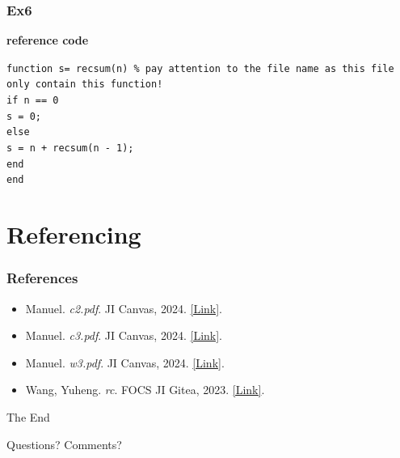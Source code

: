 \documentclass[
	11pt, %
]{beamer}
\begin{document}
\begin{frame}
	\frametitle{Ex6}
    \textbf{reference code}

    \bigskip

    \texttt{function s= recsum(n) \% pay attention to the file name as this file only contain this function!}
    \\\quad \texttt{if n == 0}
    \\\quad  \quad \texttt{s = 0;}
    \\\quad   \texttt{else}
    \\\quad  \quad \texttt{s = n + recsum(n - 1); }
    \\\quad   \texttt{end}
\\\texttt{end}

\end{frame}

\section{Referencing}

\begin{frame} %
	\frametitle{References}
	
	\begin{itemize}
    

    \item Manuel. \textit{c2.pdf}. JI Canvas, 2024. \href{https://jicanvas.com/courses/917/files/folder/lectures?preview=333612}{[Link]}.

    \item Manuel. \textit{c3.pdf}. JI Canvas, 2024. \href{https://jicanvas.com/courses/917/files/folder/lectures?preview=333613}{[Link]}.

    \item Manuel. \textit{w3.pdf}. JI Canvas, 2024. \href{https://jicanvas.com/courses/917/files/folder/worksheets?preview=333631}{[Link]}.

    \item Wang, Yuheng. \textit{rc}. FOCS JI Gitea, 2023. \href{https://focs.ji.sjtu.edu.cn/git/engr151-23fa/course-support/src/branch/master/rc}{[Link]}.
\end{itemize}
\end{frame}


\begin{frame}[plain] %
	\begin{center}
		{\Huge The End}
		
		\bigskip\bigskip %
		
		{\LARGE Questions? Comments?}
	\end{center}
\end{frame}

\end{document}
